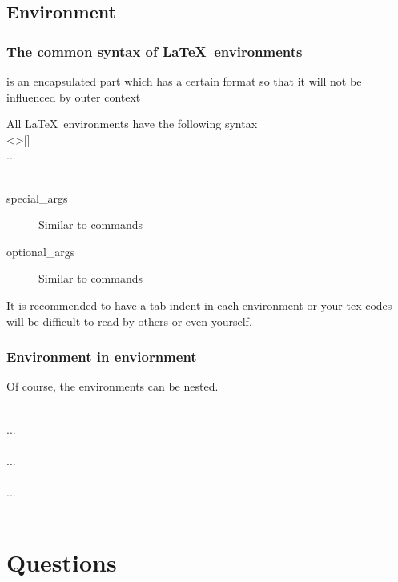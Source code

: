 \subsection{Environment}

\begin{frame}
	\frametitle{The common syntax of \LaTeX\ environments}
	\begin{definition}
		 is an encapsulated part which has a certain format so that it will not be influenced by outer context
	\end{definition}
	All \LaTeX\ environments have the following syntax\\
	\textless {}\textgreater []\\
	\qquad...\\
	\\
	\begin{description}
		\item[special\_args]	Similar to commands
		\item[optional\_args]	Similar to commands
	\end{description}
	It is recommended to have a tab indent in each environment or your tex codes will be difficult to read by others or even \alert{yourself}.
\end{frame}

\begin{frame}
	\frametitle{Environment in enviornment}
	Of course, the environments can be nested.\\
	\begin{example}
		\\
		\qquad ...\\
		\qquad{}\\
		\qquad\qquad ...\\
		\qquad{}\\
		\qquad ...\\
		\\
	\end{example}
\end{frame}

\section*{Questions}
